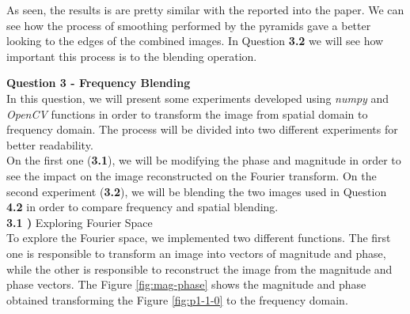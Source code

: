 \documentclass[12pt,a4paper]{article}
\begin{document}
As seen, the results is are pretty similar with the reported into the paper. We can see how the process of smoothing performed by the pyramids gave a better looking to the edges of the combined images. In Question \textbf{3.2} we will see how important this process is to the blending operation.

\newpage

\textbf{\LARGE Question 3 - Frequency Blending} \\

In this question, we will present some experiments developed using \emph{numpy} and \emph{OpenCV} functions in order to transform the image from spatial domain to frequency domain. The process will be divided into two different experiments for better readability. \\

On the first one (\textbf{3.1}), we will be modifying the phase and magnitude in order to see the impact on the image reconstructed on the Fourier transform. On the second experiment (\textbf{3.2}), we will be blending the two images used in Question \textbf{4.2} in order to compare frequency and spatial blending. \\

\textbf{3.1 )} Exploring Fourier Space \\

To explore the Fourier space, we implemented two different functions. The first one is responsible to transform an image into vectors of magnitude and phase, while the other is responsible to reconstruct the image from the magnitude and phase vectors. The Figure \ref{fig:mag-phase} shows the magnitude and phase obtained transforming the Figure \ref{fig:p1-1-0} to the frequency domain. \\
\end{document}
